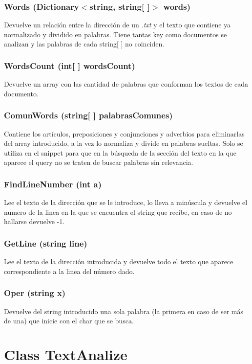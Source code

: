 \documentclass[a4paper,12pt,]{article}
\begin{document}
\subsubsection*{Words (Dictionary$<$string, string[ ]$>$ words)}
Devuelve un relación entre la dirección de un \textit{.txt} y el texto que contiene ya normalizado y dividido en 
palabras. Tiene tantas key como documentos se analizan y las palabras de cada string[ ] no coinciden.

\subsubsection*{WordsCount (int[ ] wordsCount)}
Devuelve un array con las cantidad de palabras que conforman los textos de cada documento.

\subsubsection*{ComunWords (string[ ] palabrasComunes)}
Contiene los artículos, preposiciones y conjunciones y adverbios para eliminarlas del array introducido, a la vez 
lo normaliza y divide en palabras sueltas.
Solo se utiliza en el snippet para que en la búsqueda de la sección del texto en la que aparece el query no se 
traten de buscar palabras sin relevancia.

\subsubsection*{FindLineNumber (int a)}
Lee el texto de la dirección que se le introduce, lo lleva a minúscula y devuelve el numero de la linea en la 
que se encuentra el string que recibe, en caso de no hallarse devuelve -1.

\subsubsection*{GetLine (string line)}
Lee el texto de la dirección introducida y devuelve todo el texto que aparece correspondiente a la linea del 
número dado.

\subsubsection*{Oper (string x)}
Devuelve del string introducido una sola palabra (la primera en caso de ser más de una) que inicie con el char 
que se busca.

\section*{Class TextAnalize}
\end{document}
